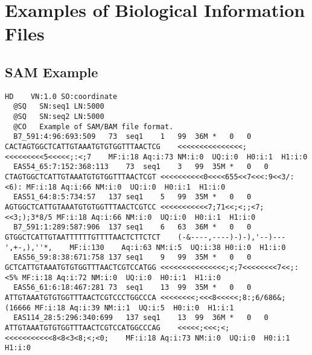 \chapter{Examples of Biological Information Files}\label{annex:formats}

\section{SAM Example}\label{annex:sam}
\begin{lstlisting}[numbers=none, breaklines=true]
  HD	VN:1.0 SO:coordinate
  @SQ	SN:seq1	LN:5000
  @SQ	SN:seq2	LN:5000
  @CO	Example of SAM/BAM file format.
  B7_591:4:96:693:509	73	seq1	1	99	36M	*	0	0	CACTAGTGGCTCATTGTAAATGTGTGGTTTAACTCG	<<<<<<<<<<<<<<<;<<<<<<<<<5<<<<<;:<;7	MF:i:18	Aq:i:73	NM:i:0	UQ:i:0	H0:i:1	H1:i:0
  EAS54_65:7:152:368:113	73	seq1	3	99	35M	*	0	0	CTAGTGGCTCATTGTAAATGTGTGGTTTAACTCGT	<<<<<<<<<<0<<<<655<<7<<<:9<<3/:<6):	MF:i:18	Aq:i:66	NM:i:0	UQ:i:0	H0:i:1	H1:i:0
  EAS51_64:8:5:734:57	137	seq1	5	99	35M	*	0	0	AGTGGCTCATTGTAAATGTGTGGTTTAACTCGTCC	<<<<<<<<<<<7;71<<;<;;<7;<<3;);3*8/5	MF:i:18	Aq:i:66	NM:i:0	UQ:i:0	H0:i:1	H1:i:0
  B7_591:1:289:587:906	137	seq1	6	63	36M	*	0	0	GTGGCTCATTGTAATTTTTTGTTTTAACTCTTCTCT	(-&----,----)-)-),'--)---',+-,),''*,	MF:i:130	Aq:i:63	NM:i:5	UQ:i:38	H0:i:0	H1:i:0
  EAS56_59:8:38:671:758	137	seq1	9	99	35M	*	0	0	GCTCATTGTAAATGTGTGGTTTAACTCGTCCATGG	<<<<<<<<<<<<<<<;<;7<<<<<<<<7<<;:<5%	MF:i:18	Aq:i:72	NM:i:0	UQ:i:0	H0:i:1	H1:i:0
  EAS56_61:6:18:467:281	73	seq1	13	99	35M	*	0	0	ATTGTAAATGTGTGGTTTAACTCGTCCCTGGCCCA	<<<<<<<<;<<<8<<<<<;8:;6/686&;(16666	MF:i:18	Aq:i:39	NM:i:1	UQ:i:5	H0:i:0	H1:i:1
  EAS114_28:5:296:340:699	137	seq1	13	99	36M	*	0	0	ATTGTAAATGTGTGGTTTAACTCGTCCATGGCCCAG	<<<<<;<<<;<;<<<<<<<<<<<8<8<3<8;<;<0;	MF:i:18	Aq:i:73	NM:i:0	UQ:i:0	H0:i:1	H1:i:0
\end{lstlisting}

